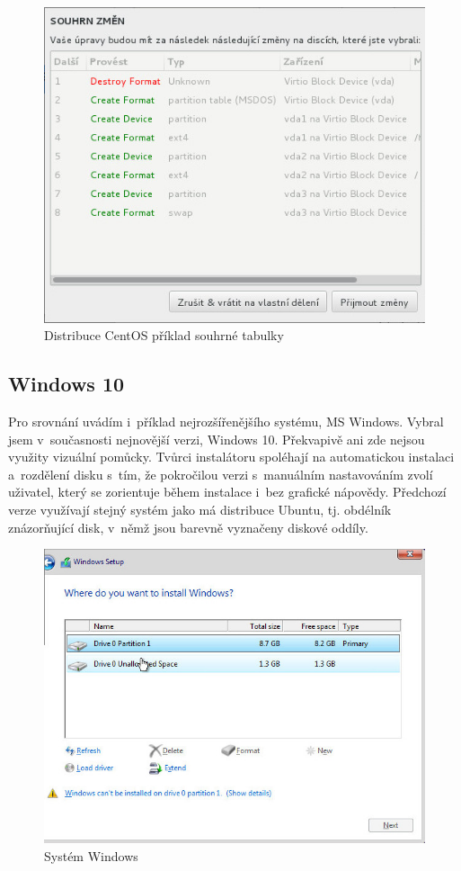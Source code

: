 \documentclass[color,table,oneside,nolot,nolof]{fithesis}
\begin{document}
\begin{figure}[h!]
	\label{fig:centos2}
	\caption{Distribuce CentOS příklad souhrné tabulky}
	\centering
	\includegraphics[width=.8\columnwidth]{pictures/centos3.jpg}
\end{figure}

\subsection{Windows 10}

	Pro srovnání uvádím i~příklad nejrozšířenějšího systému, MS Windows. Vybral jsem v~současnosti nejnovější verzi, Windows 10. Překvapivě ani zde nejsou využity vizuální pomůcky\cite{windows}.
	Tvůrci instalátoru spoléhají na automatickou instalaci a~rozdělení disku s~tím, že pokročilou verzi s~manuálním nastavováním zvolí uživatel, který se zorientuje během instalace i~bez grafické nápovědy. 
	Předchozí verze využívají stejný systém jako má distribuce Ubuntu, tj. obdélník znázorňující disk, v~němž jsou barevně vyznačeny diskové oddíly.

\begin{figure}[h!]
	\label{fig:win}
	\caption{Systém Windows}
	\centering
	\includegraphics[width=.8\columnwidth]{pictures/win1.jpg}
\end{figure}
\end{document}
